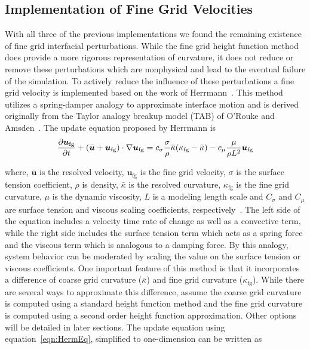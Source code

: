 \subsection{Implementation of Fine Grid Velocities}
With all three of the previous implementations we found the remaining existence of fine grid interfacial perturbations. While the fine grid height function method does provide a more rigorous representation of curvature, it does not reduce or remove these perturbations which are nonphysical and lead to the eventual failure of the simulation. To actively reduce the influence of these perturbations a fine grid velocity is implemented based on the work of Herrmann~\cite{Herrmann2013}. This method utilizes a spring-damper analogy to approximate interface motion and is derived  originally from the Taylor analogy breakup model (TAB) of O'Rouke and Amsden~\cite{TAB}. The update equation proposed by Herrmann  is 
\begin{equation}
\frac{\partial \mbox{\boldmath{$u$}}_{\text{fg}}}{\partial t} +
(\bar{\mbox{\boldmath{$u$}}}+\mbox{\boldmath{$u$}}_{\text{fg}}) \cdot \nabla \mbox{\boldmath{$u$}}_{\text{fg}} = \\
c_{\sigma}\frac{\sigma}{\rho}\bar{\kappa}(\kappa_{\text{fg}}-\bar{\kappa})- 
c_{\mu}\frac{\mu}{\rho L^2}\mbox{\boldmath{$u$}}_{\text{fg}}\nonumber
\label{eqn:HermEq}
\end{equation}

\noindent where, $\bar{\bm{u}}$ is the resolved velocity,
$\bm{u}_{\text{fg}}$ is the fine grid velocity,
$\sigma$ is the surface tension coefficient,
$\rho$ is density, 
$\bar{\kappa}$ is the resolved curvature,
$\kappa_{\text{fg}}$ is the fine grid curvature,
$\mu$ is the dynamic viscosity,
$L$ is a modeling length scale and
$C_\sigma$ and
$C_\mu$ are surface tension and viscous scaling coefficients, respectively~\cite{Herrmann2013}. 
The left side of the equation includes a velocity time rate of change as well as a convective term, while the right side includes the surface tension term which acts as a spring force and the viscous term which is analogous to a damping force. By this analogy, system behavior can be moderated by scaling the value on the surface tension or viscous coefficients. One important feature of this method is that it incorporates a difference of coarse grid curvature ($\bar{\kappa}$) and fine grid curvature ($\kappa_{\text{fg}}$). While there are several ways to approximate this difference, assume the coarse grid curvature is computed using a standard height function method and the fine grid curvature is computed using a second order height function approximation. Other options will be detailed in later sections. The update equation using equation~\ref{eqn:HermEq}, simplified to one-dimension can be written as 

